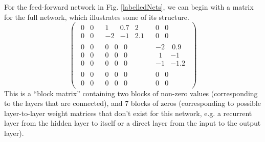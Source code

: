 For the feed-forward network in Fig. \ref{labelledNets}, we can begin with a matrix for the full network, which illustrates some of its structure.
\begin{equation*}
   \left( 
   \begin{array} {c|c|c}
   \begin{matrix} 0 & 0  \\ 0 & 0 \end{matrix} &
   \begin{matrix} 1 & 0.7 & 2 \\ -2 & -1 & 2.1 \end{matrix} &
   \begin{matrix} 0 & 0  \\ 0 & 0 \end{matrix} \\
   \hline
   \begin{matrix} 0 & 0  \\  0 & 0  \\  0 & 0   \end{matrix} &
   \begin{matrix} 0 & 0 & 0  \\ 0 & 0 & 0 \\ 0 & 0 & 0  \end{matrix} &
   \begin{matrix} -2 & ~0.9  \\  ~~1 & -1  \\  -1 & -1.2  \end{matrix} \\
   \hline
   \begin{matrix} 0 & 0  \\ 0 & 0 \end{matrix} &
   \begin{matrix} 0 & 0 & 0  \\ 0 & 0 & 0 \end{matrix} &
   \begin{matrix} 0 & 0  \\ 0 & 0 \end{matrix}
   \end{array}
   \right)
\end{equation*}
This is a ``block matrix'' containing two blocks of non-zero values (corresponding to the layers that are connected), and 7 blocks of zeros (corresponding to possible layer-to-layer weight matrices that don't exist for this network, e.g. a recurrent layer from the hidden layer to itself or a direct layer from the input to the output  layer). 

